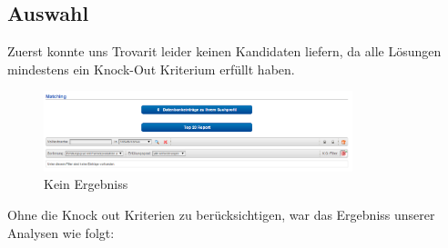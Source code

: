 \documentclass[12pt]{article}
\begin{document}
\subsection{Auswahl}
Zuerst konnte uns Trovarit leider keinen Kandidaten liefern, da alle Lösungen mindestens ein Knock-Out Kriterium erfüllt haben.
\begin{figure}[here!]
\centering
\includegraphics[width=0.8\textwidth]{images/matching1}
\caption{Kein Ergebniss}
\label{fig:matching1}
\end{figure}\FloatBarrier
\noindent
Ohne die Knock out Kriterien zu berücksichtigen, war das Ergebniss unserer Analysen wie folgt:
\end{document}
